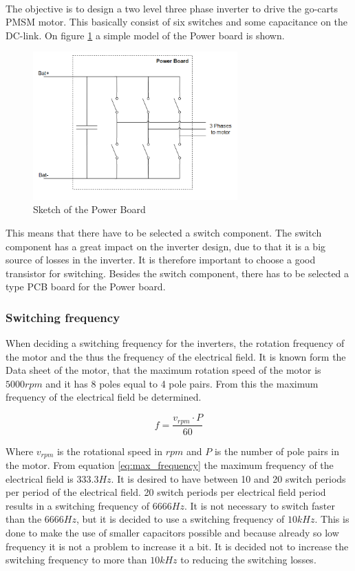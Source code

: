 \\
The objective is to design a two level three phase inverter to drive the go-carts PMSM motor. This basically consist of six switches and some capacitance on the DC-link. On figure \ref{fig:Sketch_PowerBoard} a simple model of the Power board is shown.

    \begin{figure}[H]
		\centering
		\includegraphics[width=0.7\textwidth]{pictures/hardware/Power_Board/Sketch_of_powerBoard.PNG}
		\caption{Sketch of the Power Board}
		\label{fig:Sketch_PowerBoard}
	\end{figure} 
	
This means that there have to be selected a switch component. The switch component has a great impact on the inverter design, due to that it is a big source of losses in the inverter. It is therefore important to choose a good transistor for switching. Besides the switch component, there has to be selected a type PCB board for the Power board.

\subsubsection{Switching frequency} \label{switching_frequency}
When deciding a switching frequency for the inverters, the rotation frequency of the motor and the thus the frequency of the electrical field.
It is known form the Data sheet of the motor, that the maximum rotation speed of the motor is $5000 rpm$ and it has 8 poles equal to 4 pole pairs. From this the maximum frequency of the electrical field be determined.

\begin{equation}
    f = \frac{v_{rpm} \cdot P}{60}
    \label{eq:max_frequency}
\end{equation}

Where $v_{rpm}$ is the rotational speed in $rpm$ and $P$ is the number of pole pairs in the motor.
From equation \ref{eq:max_frequency} the maximum frequency of the electrical field is $333.3 Hz$.
It is desired to have between 10 and 20 switch periods per period of the electrical field. 20 switch periods per electrical field period results in a switching frequency of $6666 Hz$. It is not necessary to switch faster than the $6666 Hz$, but it is decided to use a switching frequency of $10 kHz$. This is done to make the use of smaller capacitors possible and because already so low frequency it is not a problem to increase it a bit.
It is decided not to increase the switching frequency to more than $10 kHz$ to reducing the switching losses.


